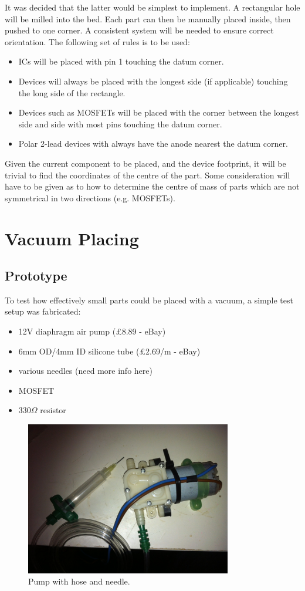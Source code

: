 It was decided that the latter would be simplest to implement. A rectangular hole will be milled into the bed. Each part can then
be manually placed inside, then pushed to one corner. A consistent system will be needed to ensure correct orientation. The following set of rules
is to be used:

\begin{itemize} \itemsep0em
	\item	ICs will be placed with pin 1 touching the datum corner.
	\item	Devices will always be placed with the longest side (if applicable) touching the long side of the rectangle.
	\item	Devices such as MOSFETs will be placed with the corner between the longest side and side with most pins touching the datum corner.
	\item	Polar 2-lead devices with always have the anode nearest the datum corner.
\end{itemize}

Given the current component to be placed, and the device footprint, it will be trivial to find the coordinates of the centre of the part. Some
consideration will have to be given as to how to determine the centre of mass of parts which are not symmetrical in two directions (e.g. MOSFETs).
	   
\section{Vacuum Placing}
\subsection{Prototype}
To test how effectively small parts could be placed with a vacuum, a simple test setup was fabricated:

\begin{itemize} \itemsep0em
	\item	12V diaphragm air pump (\pounds 8.89 - eBay)
	\item	6mm OD/4mm ID silicone tube (\pounds 2.69/m - eBay)
	\item	various needles (need more info here)
	\item	MOSFET
	\item	330$\Omega$ resistor
\end{itemize}

\begin{figure}[ht!]
\centering
\includegraphics[width=90mm]{resources/pump_and_hose.jpg}
\caption{Pump with hose and needle.}
\label{hose and needle}
\end{figure}

